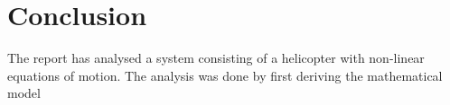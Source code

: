 \section{Conclusion}\label{sec:conclusion}
The report has analysed a system consisting of a helicopter with non-linear equations of motion. The analysis was done by first deriving the mathematical model  